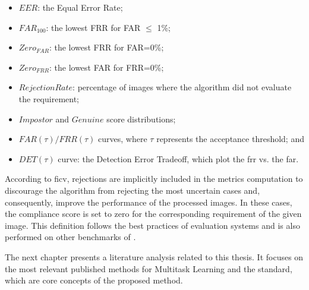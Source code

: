 \begin{itemize}
\item $EER$: the Equal Error Rate;
\item $FAR_{100}$: the lowest FRR for FAR $\leq$ 1\%;
\item $Zero_{FAR}$: the lowest FRR for FAR=0\%;
\item $Zero_{FRR}$: the lowest FAR for FRR=0\%;
\item $Rejection Rate$: percentage of images where the algorithm did not evaluate the requirement;
\item $Impostor$ and $Genuine$ score distributions;
\item $FAR(\tau) / FRR(\tau)$ curves, where $\tau$ represents the acceptance threshold; and
\item $DET(\tau)$ curve: the Detection Error Tradeoff, which plot the \acl{frr} vs. the \acl{far}.
\end{itemize}

According to \acs{ficv}, rejections are implicitly included in the metrics computation to discourage the algorithm from rejecting the most uncertain cases and, consequently, improve the performance of the processed images. In these cases, the compliance score is set to zero for the corresponding requirement of the given image. This definition follows the best practices of evaluation systems and is also performed on other benchmarks of \fvcongoing.

The next chapter presents a literature analysis related to this thesis. It focuses on the most relevant published methods for Multitask Learning and the \icao standard, which are core concepts of the proposed method.
